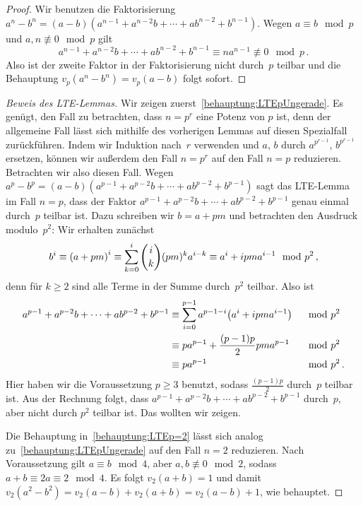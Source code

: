 \begin{proof}
	Wir benutzen die Faktorisierung $a^n-b^n=(a-b)(a^{n-1}+a^{n-2}b+\dotsb+ab^{n-2}+b^{n-1})$. Wegen $a\equiv b\mod p$ und $a,n\not\equiv 0\mod p$ gilt
	\begin{equation*}
		a^{n-1}+a^{n-2}b+\dotsb+ab^{n-2}+b^{n-1}\equiv na^{n-1}\not\equiv 0\mod p\,.
	\end{equation*}
	Also ist der zweite Faktor in der Faktorisierung nicht durch~$p$ teilbar und die Behauptung $v_p(a^n-b^n)=v_p(a-b)$ folgt sofort.
\end{proof}

\begin{proof}[Beweis des LTE-Lemmas]
	Wir zeigen zuerst~\ref{behauptung:LTEpUngerade}. Es genügt, den Fall zu betrachten, dass $n=p^r$ eine Potenz von $p$ ist, denn der allgemeine Fall lässt sich mithilfe des vorherigen Lemmas auf diesen Spezialfall zurückführen. Indem wir Induktion nach~$r$ verwenden und $a$, $b$ durch $a^{p^{r-1}}$, $b^{p^{r-1}}$ ersetzen, können wir außerdem den Fall $n=p^r$ auf den Fall $n=p$ reduzieren. Betrachten wir also diesen Fall. Wegen $a^p-b^p=(a-b)(a^{p-1}+a^{p-2}b+\dotsb+ab^{p-2}+b^{p-1})$ sagt das LTE-Lemma im Fall $n=p$, dass der Faktor $a^{p-1}+a^{p-2}b+\dotsb+ab^{p-2}+b^{p-1}$ genau einmal durch~$p$ teilbar ist. Dazu schreiben wir $b=a+pm$ und betrachten den Ausdruck modulo~$p^2$: Wir erhalten zunächst
	\begin{equation*}
		b^i\equiv \parens*{a+pm}^i\equiv \sum_{k=0}^i\binom{i}{k}(pm)^ka^{i-k}\equiv a^i+ipm a^{i-1}\mod p^2\,,
	\end{equation*}
	denn für $k\geqslant 2$ sind alle Terme in der Summe durch~$p^2$ teilbar. Also ist
	\begin{alignat*}{2}
		a^{p-1}+a^{p-2}b+\dotsb+ab^{p-2}+b^{p-1}&\equiv \sum_{i=0}^{p-1}a^{p-1-i}\parens*{a^i+ipma^{i-1}} && \mod p^2\\
		&\equiv pa^{p-1}+\frac{(p-1)p}{2}pma^{p-1} &&  \mod p^2\\
		&\equiv pa^{p-1} && \mod p^2\,.
	\end{alignat*}
	Hier haben wir die Voraussetzung $p\geqslant 3$ benutzt, sodass $\frac{(p-1)p}{2}$ durch~$p$ teilbar ist. Aus der Rechnung folgt, dass $a^{p-1}+a^{p-2}b+\dotsb+ab^{p-2}+b^{p-1}$ durch~$p$, aber nicht durch $p^2$ teilbar ist. Das wollten wir zeigen.
	
	Die Behauptung in~\ref{behauptung:LTEp=2} lässt sich analog zu~\ref{behauptung:LTEpUngerade} auf den Fall $n=2$ reduzieren. Nach Voraussetzung gilt $a\equiv b\mod 4$, aber $a,b\not\equiv 0\mod 2$, sodass $a+b\equiv 2a\equiv 2\mod 4$. Es folgt $v_2(a+b)=1$ und damit $v_2(a^2-b^2)=v_2(a-b)+v_2(a+b)=v_2(a-b)+1$, wie behauptet.
\end{proof}

